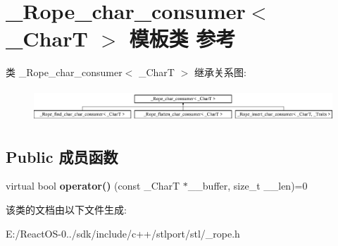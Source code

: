 \hypertarget{class___rope__char__consumer}{}\section{\+\_\+\+Rope\+\_\+char\+\_\+consumer$<$ \+\_\+\+CharT $>$ 模板类 参考}
\label{class___rope__char__consumer}
类 \+\_\+\+Rope\+\_\+char\+\_\+consumer$<$ \+\_\+\+CharT $>$ 继承关系图\+:\begin{figure}[H]
\begin{center}
\leavevmode
\includegraphics[height=1.236203cm]{class___rope__char__consumer}
\end{center}
\end{figure}
\subsection*{Public 成员函数}
\begin{DoxyCompactItemize}
\item 
\mbox{\label{class___rope__char__consumer_a2cb1425fb914de60a2c2e14a5a426afa}} 
virtual bool {\bfseries operator()} (const \+\_\+\+CharT $\ast$\+\_\+\+\_\+buffer, size\+\_\+t \+\_\+\+\_\+len)=0
\end{DoxyCompactItemize}


该类的文档由以下文件生成\+:\begin{DoxyCompactItemize}
\item 
E\+:/\+React\+O\+S-\/0../sdk/include/c++/stlport/stl/\+\_\+rope.\+h\end{DoxyCompactItemize}
